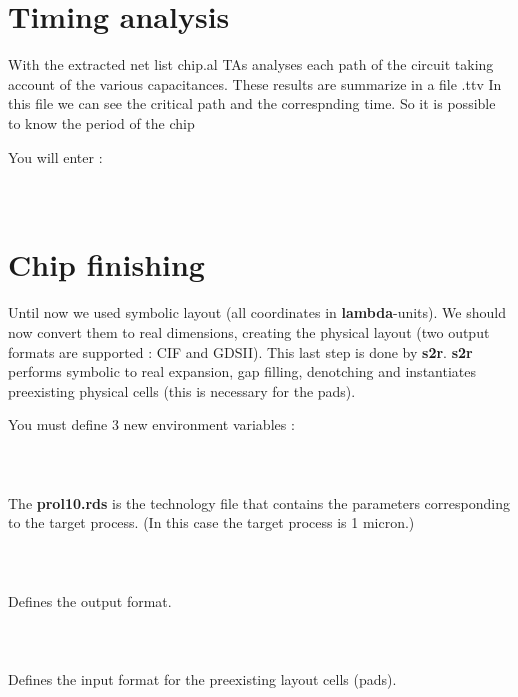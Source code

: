 \documentclass[11pt,a4]{article}
\begin{document}
\section{Timing analysis}
With the extracted net list chip.al TAs analyses each path of the circuit taking account of the various capacitances. These results are summarize in a file .ttv In this file we can see the critical path and the correspnding time. So it is possible to know the period of the chip

You will enter :\\
\\
\\

\section{Chip finishing}

Until now we used symbolic layout (all coordinates in {\bf lambda}-units).
We should now convert them to real dimensions, creating the physical layout
(two output formats are supported : CIF and GDSII).
This last step is done by {\bf s2r}.
{\bf s2r} performs symbolic to real expansion, gap filling, denotching
and instantiates preexisting physical cells 
(this is necessary for the pads).

You must define 3 new environment variables :\\
\\
\\
\\
The {\bf prol10.rds} is the technology file that contains the parameters
corresponding to the target process.
(In this case the target process is 1 micron.)\\
\\
\\
\\
Defines the output format.\\
\\
\\
\\
Defines the input format for the preexisting layout cells (pads).
\end{document}
